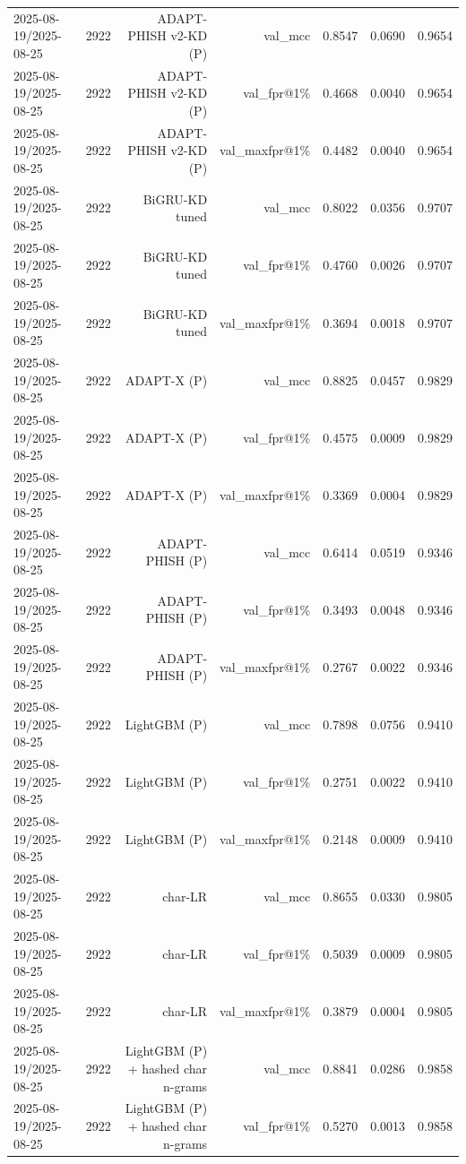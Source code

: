 \begin{table}[t]
\begin{tabular}{llrrrrr}
2025-08-19/2025-08-25 & 2922 & ADAPT-PHISH v2-KD (P) & val\_mcc & 0.8547 & 0.0690 & 0.9654 \\
2025-08-19/2025-08-25 & 2922 & ADAPT-PHISH v2-KD (P) & val\_fpr@1\% & 0.4668 & 0.0040 & 0.9654 \\
2025-08-19/2025-08-25 & 2922 & ADAPT-PHISH v2-KD (P) & val\_maxfpr@1\% & 0.4482 & 0.0040 & 0.9654 \\
2025-08-19/2025-08-25 & 2922 & BiGRU-KD tuned & val\_mcc & 0.8022 & 0.0356 & 0.9707 \\
2025-08-19/2025-08-25 & 2922 & BiGRU-KD tuned & val\_fpr@1\% & 0.4760 & 0.0026 & 0.9707 \\
2025-08-19/2025-08-25 & 2922 & BiGRU-KD tuned & val\_maxfpr@1\% & 0.3694 & 0.0018 & 0.9707 \\
2025-08-19/2025-08-25 & 2922 & ADAPT-X (P) & val\_mcc & 0.8825 & 0.0457 & 0.9829 \\
2025-08-19/2025-08-25 & 2922 & ADAPT-X (P) & val\_fpr@1\% & 0.4575 & 0.0009 & 0.9829 \\
2025-08-19/2025-08-25 & 2922 & ADAPT-X (P) & val\_maxfpr@1\% & 0.3369 & 0.0004 & 0.9829 \\
2025-08-19/2025-08-25 & 2922 & ADAPT-PHISH (P) & val\_mcc & 0.6414 & 0.0519 & 0.9346 \\
2025-08-19/2025-08-25 & 2922 & ADAPT-PHISH (P) & val\_fpr@1\% & 0.3493 & 0.0048 & 0.9346 \\
2025-08-19/2025-08-25 & 2922 & ADAPT-PHISH (P) & val\_maxfpr@1\% & 0.2767 & 0.0022 & 0.9346 \\
2025-08-19/2025-08-25 & 2922 & LightGBM (P) & val\_mcc & 0.7898 & 0.0756 & 0.9410 \\
2025-08-19/2025-08-25 & 2922 & LightGBM (P) & val\_fpr@1\% & 0.2751 & 0.0022 & 0.9410 \\
2025-08-19/2025-08-25 & 2922 & LightGBM (P) & val\_maxfpr@1\% & 0.2148 & 0.0009 & 0.9410 \\
2025-08-19/2025-08-25 & 2922 & char-LR & val\_mcc & 0.8655 & 0.0330 & 0.9805 \\
2025-08-19/2025-08-25 & 2922 & char-LR & val\_fpr@1\% & 0.5039 & 0.0009 & 0.9805 \\
2025-08-19/2025-08-25 & 2922 & char-LR & val\_maxfpr@1\% & 0.3879 & 0.0004 & 0.9805 \\
2025-08-19/2025-08-25 & 2922 & LightGBM (P) + hashed char n-grams & val\_mcc & 0.8841 & 0.0286 & 0.9858 \\
2025-08-19/2025-08-25 & 2922 & LightGBM (P) + hashed char n-grams & val\_fpr@1\% & 0.5270 & 0.0013 & 0.9858 \\

\end{tabular}
\end{table}
